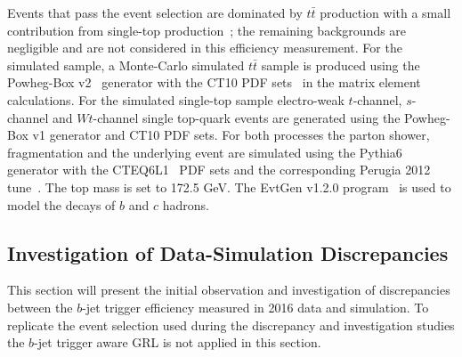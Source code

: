 Events that pass the event selection 
are dominated by $t\bar{t}$ production with a small contribution from single-top production~\cite{trig-ttbar};
the remaining backgrounds are negligible and are not considered in this efficiency measurement.
For the simulated sample, a Monte-Carlo simulated $t\bar{t}$ sample is produced using the
Powheg-Box v2~\cite{trig-powheg} generator with the CT10 PDF sets~\cite{trig-CT10} in the matrix element calculations.
For the simulated single-top sample electro-weak $t$-channel, $s$-channel and $Wt$-channel single top-quark events are generated using the Powheg-Box v1 generator and CT10 PDF sets.
For both processes the parton shower, fragmentation and the underlying event are simulated using the {\sc Pythia6}~\cite{trig-pythia6} generator with the CTEQ6L1~\cite{trig-CTEQ6L1} PDF sets
and the corresponding Perugia 2012 tune~\cite{trig-perugia}.
The top mass is set to 172.5 GeV.
The {\sc EvtGen} v1.2.0 program~\cite{trig-evtGen} is used to model the decays of $b$ and $c$ hadrons.

\subsection{Investigation of Data-Simulation Discrepancies}
\label{sec:trig-inv}

This section will present the initial observation and investigation of discrepancies between the $b$-jet trigger efficiency measured in 2016 data and simulation.
To replicate the event selection used during the discrepancy and investigation studies the $b$-jet trigger aware GRL is not applied in this section.

